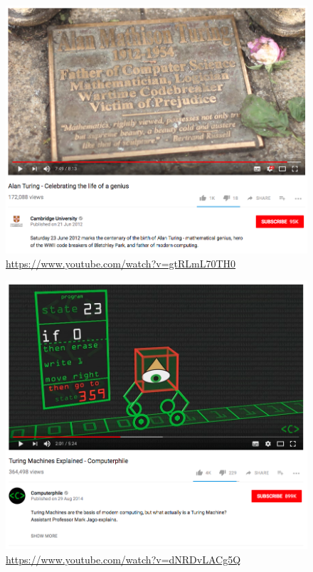 \begin{frame}
	\begin{figure}
		\includegraphics[scale=0.2]{assets/turingvideo.png}
		\caption{\href{https://www.youtube.com/watch?v=gtRLmL70TH0}{https://www.youtube.com/watch?v=gtRLmL70TH0}}
	\end{figure}
\end{frame}

\begin{frame}

	\begin{figure}
		\includegraphics[scale=0.2]{assets/compute.png}
		\caption{\href{https://www.youtube.com/watch?v=dNRDvLACg5Q}{https://www.youtube.com/watch?v=dNRDvLACg5Q}}
	\end{figure}
\end{frame}

